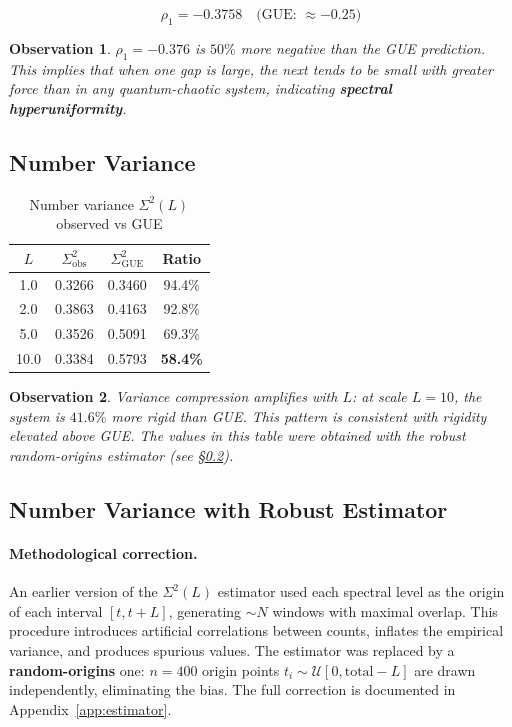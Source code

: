 \documentclass[12pt, a4paper]{article}
\newtheorem{observation}{Observation}
\begin{document}
\[
  \rho_1 = -0.3758 \quad \text{(GUE: } \approx -0.25\text{)}
\]

\begin{observation}
$\rho_1 = -0.376$ is $50\%$ more negative than the GUE prediction.
This implies that when one gap is large, the next tends to be small
with greater force than in any quantum-chaotic system, indicating
\textbf{spectral hyperuniformity}.
\end{observation}

\subsection{Number Variance}

\begin{table}[H]
\centering
\caption{Number variance $\Sigma^2(L)$ observed vs GUE}
\begin{tabular}{cccc}
\toprule
$L$ & $\Sigma^2_{\text{obs}}$ & $\Sigma^2_{\text{GUE}}$ & Ratio \\
\midrule
1.0  & 0.3266 & 0.3460 & 94.4\% \\
2.0  & 0.3863 & 0.4163 & 92.8\% \\
5.0  & 0.3526 & 0.5091 & 69.3\% \\
10.0 & 0.3384 & 0.5793 & \textcolor{anomaly}{\textbf{58.4\%}} \\
\bottomrule
\end{tabular}
\end{table}

\begin{observation}
Variance compression amplifies with $L$: at scale $L=10$, the
system is $41.6\%$ more rigid than GUE. This pattern is consistent
with rigidity elevated above GUE. The values in this table were
obtained with the robust random-origins estimator
(see \S\ref{sec:sigma2_robust}).
\end{observation}

\subsection{Number Variance with Robust Estimator}
\label{sec:sigma2_robust}

\paragraph{Methodological correction.}
An earlier version of the $\Sigma^2(L)$ estimator used each spectral
level as the origin of each interval $[t, t+L]$, generating $\sim N$
windows with maximal overlap. This procedure introduces artificial
correlations between counts, inflates the empirical variance, and
produces spurious values. The estimator was replaced by a
\textbf{random-origins} one: $n = 400$ origin points
$t_i \sim \mathcal{U}[0, \text{total} - L]$ are drawn independently,
eliminating the bias. The full correction is documented in
Appendix~\ref{app:estimator}.
\end{document}
